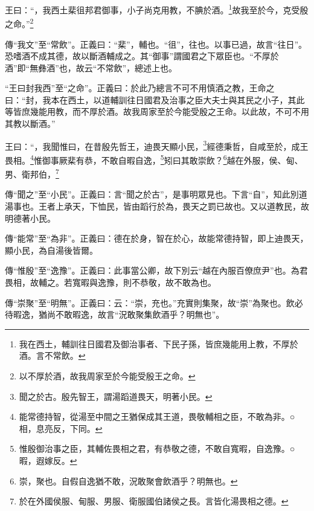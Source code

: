 王曰：“，我西土棐徂邦君御事，小子尚克用教，不腆於酒。\footnote{我在西土，輔訓往日國君及御治事者、下民子孫，皆庶幾能用上教，不厚於酒。言不常飲。}故我至於今，克受殷之命。”\footnote{以不厚於酒，故我周家至於今能受殷王之命。}


{\noindent\zhuan{}\fzbyks 傳“我文”至“常飲”。正義曰：“棐”，輔也。“徂”，往也。以事已過，故言“往日”。恐嗜酒不成其德，故以斷酒輔成之。其“御事”謂國君之下眾臣也。“不厚於酒”即“無彝酒”也，故云“不常飲”，總述上也。 \par}

{\noindent\shu{}\fzkt “王曰封我西”至“之命”。正義曰：於此乃總言不可不用慎酒之教，王命之曰：“封，我本在西土，以道輔訓往日國君及治事之臣大夫士與其民之小子，其此等皆庶幾能用教，而不厚於酒。故我周家至於今能受殷之王命。以此故，不可不用其教以斷酒。” \par}

王曰：“，我聞惟曰，在昔殷先哲王，迪畏天顯小民，\footnote{聞之於古。殷先智王，謂湯蹈道畏天，明著小民。}經德秉哲，自咸至於，成王畏相。\footnote{能常德持智，從湯至中間之王猶保成其王道，畏敬輔相之臣，不敢為非。○相，息亮反，下同。}惟御事厥棐有恭，不敢自暇自逸，\footnote{惟殷御治事之臣，其輔佐畏相之君，有恭敬之德，不敢自寬暇，自逸豫。○暇，遐嫁反。}矧曰其敢崇飲？\footnote{崇，聚也。自假自逸猶不敢，況敢聚會飲酒乎？明無也。}越在外服，侯、甸、男、衛邦伯，\footnote{於在外國侯服、甸服、男服、衛服國伯諸侯之長。言皆化湯畏相之德。}

{\noindent\zhuan{}\fzbyks 傳“聞之”至“小民”。正義曰：言“聞之於古”，是事明眾見也。下言“自”，知此別道湯事也。王者上承天，下恤民，皆由蹈行於為，畏天之罰已故也。又以道教民，故明德著小民。 \par}

{\noindent\zhuan{}\fzbyks 傳“能常”至“為非”。正義曰：德在於身，智在於心，故能常德持智，即上迪畏天，顯小民，為自湯後皆爾。 \par}

{\noindent\zhuan{}\fzbyks 傳“惟殷”至“逸豫”。正義曰：此事當公卿，故下別云“越在內服百僚庶尹”也。為君畏相，故輔之。若寬暇與逸豫，則不恭敬，故不敢為也。 \par}

{\noindent\zhuan{}\fzbyks 傳“崇聚”至“明無”。正義曰：云：“崇，充也。”充實則集聚，故“崇”為聚也。飲必待暇逸，猶尚不敢暇逸，故言“況敢聚集飲酒乎？明無也”。 \par}

